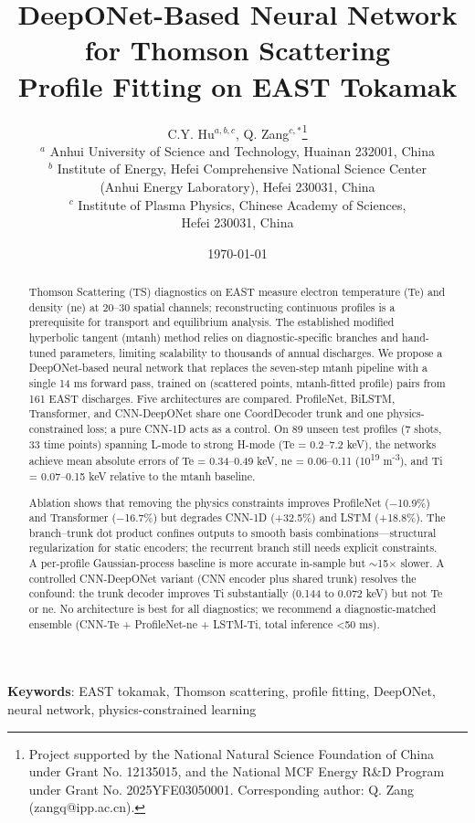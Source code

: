 \documentclass[a4paper,12pt]{article}
\title{DeepONet-Based Neural Network for Thomson Scattering \\ Profile Fitting on EAST Tokamak}
\author{%
C.Y. Hu$^{a,b,c}$, Q. Zang$^{c,\ast}$\thanks{Project supported by the National Natural Science Foundation of China under Grant No. 12135015, and the National MCF Energy R\&D Program under Grant No. 2025YFE03050001. Corresponding author: Q. Zang (zangq@ipp.ac.cn).} \\[4pt]
$^a$ Anhui University of Science and Technology, Huainan 232001, China \\
$^b$ Institute of Energy, Hefei Comprehensive National Science Center \\
(Anhui Energy Laboratory), Hefei 230031, China \\
$^c$ Institute of Plasma Physics, Chinese Academy of Sciences, \\
Hefei 230031, China
}
\date{\today}
\begin{document}
\maketitle


\begin{abstract}
\small
Thomson Scattering (TS) diagnostics on EAST measure electron temperature (Te) and density (ne) at 20--30 spatial channels; reconstructing continuous profiles is a prerequisite for transport and equilibrium analysis. The established modified hyperbolic tangent (mtanh) method relies on diagnostic-specific branches and hand-tuned parameters, limiting scalability to thousands of annual discharges. We propose a DeepONet-based neural network that replaces the seven-step mtanh pipeline with a single 14 ms forward pass, trained on (scattered points, mtanh-fitted profile) pairs from 161 EAST discharges. Five architectures are compared. ProfileNet, BiLSTM, Transformer, and CNN-DeepONet share one CoordDecoder trunk and one physics-constrained loss; a pure CNN-1D acts as a control. On 89 unseen test profiles (7 shots, 33 time points) spanning L-mode to strong H-mode (Te = 0.2--7.2 keV), the networks achieve mean absolute errors of Te = 0.34--0.49 keV, ne = 0.06--0.11 (10\textsuperscript{19} m\textsuperscript{-3}), and Ti = 0.07--0.15 keV relative to the mtanh baseline.

Ablation shows that removing the physics constraints improves ProfileNet ($-$10.9\%) and Transformer ($-$16.7\%) but degrades CNN-1D (+32.5\%) and LSTM (+18.8\%). The branch--trunk dot product confines outputs to smooth basis combinations---structural regularization for static encoders; the recurrent branch still needs explicit constraints. A per-profile Gaussian-process baseline is more accurate in-sample but $\sim$15$\times$ slower. A controlled CNN-DeepONet variant (CNN encoder plus shared trunk) resolves the confound: the trunk decoder improves Ti substantially (0.144 to 0.072 keV) but not Te or ne. No architecture is best for all diagnostics; we recommend a diagnostic-matched ensemble (CNN-Te + ProfileNet-ne + LSTM-Ti, total inference <50 ms).

\end{abstract}

\noindent\textbf{Keywords}: EAST tokamak, Thomson scattering, profile fitting, DeepONet, neural network, physics-constrained learning
\end{document}
